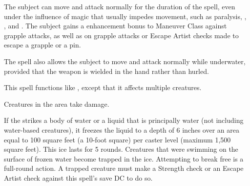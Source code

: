\spellrng{\rngtouch}
\spelldur{\durshort}
\begin{spelleffect}
  The subject can move and attack normally for the duration of the spell, even under the influence of magic that usually impedes movement, such as paralysis, , , and . The subject gains a  enhancement bonus to Maneuver Class against grapple attacks, as well as on grapple attacks or Escape Artist checks made to escape a grapple or a pin.
  \par The spell also allows the subject to move and attack normally while underwater, provided that the weapon is wielded in the hand rather than hurled.
\end{spelleffect}

\spellrng{\rngmed}
\begin{spelleffect}
  This spell functions like , except that it affects multiple creatures.
\end{spelleffect}

\spellrng{\rngmed}
\begin{spelleffect}
  Creatures in the area take damage. 
  
  If the  strikes a body of water or a liquid that is principally water (not including water-based creatures), it freezes the liquid to a depth of 6 inches over an area equal to 100 square feet (a 10-foot square) per caster level (maximum 1,500 square feet). This ice lasts for 5 rounds. Creatures that were swimming on the surface of frozen water become trapped in the ice. Attempting to break free is a full-round action. A trapped creature must make a Strength check or an Escape Artist check against this spell's save DC to do so.
\end{spelleffect}

